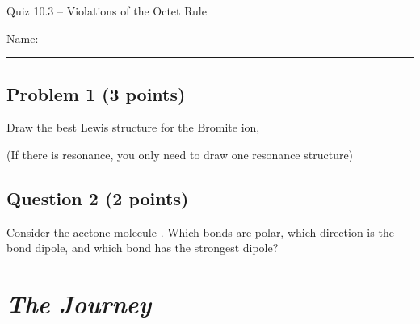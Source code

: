 \documentclass[11pt, letterpaper]{memoir}
\begin{document}
	\begin{center}
		{\large	Quiz 10.3 -- Violations of the Octet Rule}
	\end{center}
{\large Name: \rule[-1mm]{4in}{.1pt}
	
	\subsection*{Problem 1 (3 points)}
	Draw the best Lewis structure for the Bromite ion, 
	
	\noindent(If there is resonance, you only need to draw one resonance structure)
	
	\vspace{18em}
	\subsection*{Question 2 (2 points)}
	Consider the acetone molecule . Which bonds are polar, which direction is the bond dipole, and which bond has the strongest dipole?
	
	

\newpage
\pagestyle{empty}
\addtocounter{page}{-1}
\section*{\emph{The Journey}}
}
\end{document}
